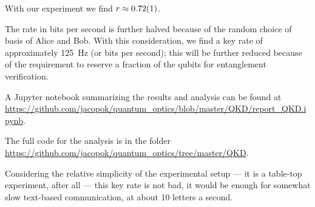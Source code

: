 \documentclass[main.tex]{subfiles}
\begin{document}
With our experiment we find \(r \approx \num{0.72+-0.01}\). 

The rate in bits per second is further halved because of the random choice of basis of Alice and Bob.
With this consideration, we find a key rate of approximately \SI{125}{Hz} (or bits per second); this will be further reduced because of the requirement to reserve a fraction of the qubits for entanglement verification.

A Jupyter notebook summarizing the results and analysis can be found at \url{https://github.com/jacopok/quantum_optics/blob/master/QKD/report_QKD.ipynb}.

The full code for the analysis is in the folder \url{https://github.com/jacopok/quantum_optics/tree/master/QKD}.

Considering the relative simplicity of the experimental setup --- it is a table-top experiment, after all --- this key rate is not bad, it would be enough for somewhat slow text-based communication, at about 10 letters a second. 
\end{document}
